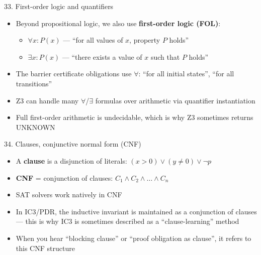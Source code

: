 \documentclass[aspectratio=169]{beamer}
\begin{document}
\begin{frame}{33. First-order logic and quantifiers}
\begin{itemize}
  \item Beyond propositional logic, we also use \textbf{first-order logic (FOL)}:
    \begin{itemize}
      \item \(\forall x: P(x)\) --- ``for all values of \(x\), property \(P\) holds''
      \item \(\exists x: P(x)\) --- ``there exists a value of \(x\) such that \(P\) holds''
    \end{itemize}
  \item The barrier certificate obligations use \(\forall\): ``for all initial states'', ``for all transitions''
  \item Z3 can handle many \(\forall\)/\(\exists\) formulas over arithmetic via quantifier instantiation
  \item Full first-order arithmetic is undecidable, which is why Z3 sometimes returns UNKNOWN
\end{itemize}
\end{frame}

\begin{frame}{34. Clauses, conjunctive normal form (CNF)}
\begin{itemize}
  \item A \textbf{clause} is a disjunction of literals: \((x > 0) \vee (y \ne 0) \vee \neg p\)
  \item \textbf{CNF} = conjunction of clauses: \(C_1 \wedge C_2 \wedge \ldots \wedge C_n\)
  \item SAT solvers work natively in CNF
  \item In IC3/PDR, the inductive invariant is maintained as a conjunction of clauses --- this is why IC3 is sometimes described as a ``clause-learning'' method
  \item When you hear ``blocking clause'' or ``proof obligation as clause'', it refers to this CNF structure
\end{itemize}
\end{frame}
\end{document}
